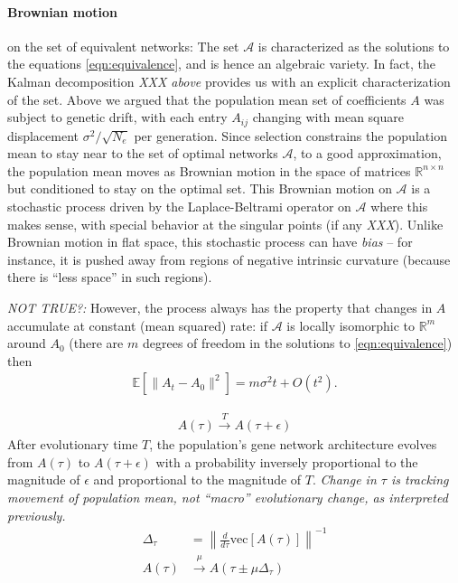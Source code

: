 \documentclass{article}
\newcommand{\plr}[1]{{\color{blue}\it #1}}
\newcommand{\jss}[1]{{\color{olive}\it #1}}
\newcommand{\R}{\mathbb{R}}
\newcommand{\E}{\mathbb{E}}
\newcommand{\calA}{\mathcal{A}}
\newcommand{\1}{\mathbbm{1}}
\begin{document}
  \paragraph{Brownian motion} on the set of equivalent networks:
  The set $\calA$ is characterized as the solutions to the equations \eqref{eqn:equivalence},
  and is hence an algebraic variety. 
  In fact, the Kalman decomposition \plr{XXX above} provides us with an explicit characterization of the set.
  Above we argued that the population mean set of coefficients $A$ was subject to genetic drift, 
  with each entry $A_{ij}$ changing with mean square displacement $\sigma^2/\sqrt{N_e}$ per generation.
  Since selection constrains the population mean to stay near to the set of optimal networks $\calA$,
  to a good approximation, the population mean moves as Brownian motion in the space of matrices $\R^{n \times n}$
  but conditioned to stay on the optimal set.
  This Brownian motion on $\calA$ is a stochastic process driven by the Laplace-Beltrami operator on $\calA$
  where this makes sense, with special behavior at the singular points (if any \plr{XXX}).
  Unlike Brownian motion in flat space, this stochastic process can have \emph{bias} --
  for instance, it is pushed away from regions of negative intrinsic curvature
  (because there is ``less space'' in such regions).

  \plr{NOT TRUE?:}
  However, the process always has the property that
  changes in $A$ accumulate at constant (mean squared) rate:
  if $\calA$ is locally isomorphic to $\R^m$ around $A_0$
  (there are $m$ degrees of freedom in the solutions to \eqref{eqn:equivalence}) then
  \begin{align}
      \E\left[ \|A_t - A_0\|^2 \right] = m \sigma^2 t + O(t^2) .
  \end{align}


  \begin{align}
    A(\tau) \xrightarrow{T} A(\tau + \epsilon)
  \end{align}
  After evolutionary time $T$, the population's gene network architecture evolves from $A(\tau)$ to $A(\tau + \epsilon)$ with a probability inversely proportional to the magnitude of $\epsilon$ and proportional to the magnitude of $T$. 
\jss{Change in $\tau$ is tracking movement of population mean, not ``macro'' evolutionary change, as interpreted previously.}
  \begin{align}
    \Delta_{\tau} &= \left\lVert \frac{d}{d \tau} \text{vec} \left[A\left(\tau\right)\right] \right\rVert^{-1} \\
    A(\tau) &\xrightarrow{\mu} A(\tau \pm \mu \Delta_{\tau})
  \end{align}
      
\end{document}
